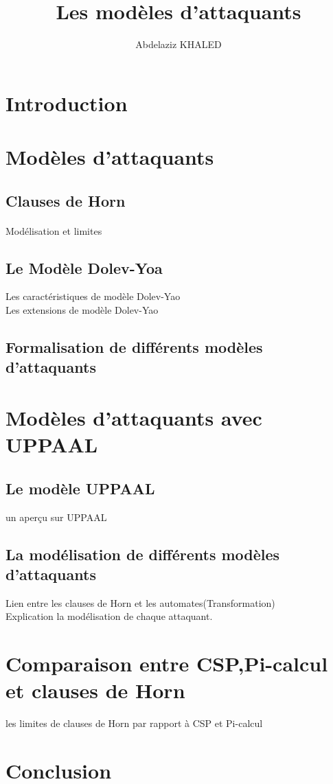 \documentclass[11pt,a4paper,twoside,openright]{scrreprt}
\author{Abdelaziz KHALED}
\title{Les modèles d'attaquants}
\begin{document}
\let\cleardoublepage\clearpage
\maketitle
\tableofcontents
\newpage

\section{Introduction}

\section{Modèles d'attaquants}
\subsection{Clauses de Horn}
\paragraph{}
Modélisation et limites

\subsection{Le Modèle Dolev-Yoa}
Les caractéristiques de modèle Dolev-Yao\\
Les extensions de modèle Dolev-Yao	
	
\subsection{Formalisation de différents modèles d'attaquants}
\section{Modèles d'attaquants avec UPPAAL}
\subsection{Le modèle UPPAAL}
un aperçu sur UPPAAL
\subsection{La modélisation de différents modèles d'attaquants}
Lien entre les clauses de Horn et les automates(Transformation)\\
Explication la modélisation de chaque attaquant.
\section{Comparaison entre CSP,Pi-calcul et clauses de Horn}
les limites de clauses de Horn par rapport à CSP et Pi-calcul
\section{Conclusion}


\end{document}

